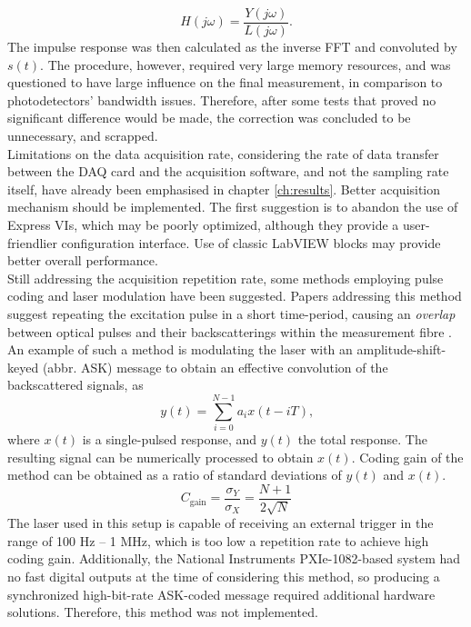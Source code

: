 \documentclass{standalone}
\begin{document}
\begin{equation}
H(j\omega) = \frac{Y(j\omega)}{L(j\omega)} \textrm{.}
\end{equation}
The impulse response was then calculated as the inverse FFT and convoluted by $s(t)$. The procedure, however, required very large memory resources, and was questioned to have large influence on the final measurement, in comparison to photodetectors' bandwidth issues. Therefore, after some tests that proved no significant difference would be made, the correction was concluded to be unnecessary, and scrapped. \\

Limitations on the data acquisition rate, considering the rate of data transfer between the DAQ card and the acquisition software, and not the sampling rate itself, have already been emphasised in chapter \ref{ch:results}. Better acquisition mechanism should be implemented. The first suggestion is to abandon the use of Express VIs, which may be poorly optimized, although they provide a user-friendlier configuration interface. Use of classic LabVIEW blocks may provide better overall performance. \\

Still addressing the acquisition repetition rate, some methods employing pulse coding and laser modulation have been suggested. Papers addressing this method suggest repeating the excitation pulse in a short time-period, causing an \textit{overlap} between optical pulses and their backscatterings within the measurement fibre \cite{coding1}\cite{coding2}. An example of such a method is modulating the laser with an amplitude-shift-keyed (abbr. ASK) message to obtain an effective convolution of the backscattered signals, as
\begin{equation}
y(t) = \sum_{i = 0}^{N-1} a_i x(t - iT) \textrm{,}
\end{equation}
where $x(t)$ is a single-pulsed response, and $y(t)$ the total response. The resulting signal can be numerically processed to obtain $x(t)$. Coding gain of the method can be obtained as a ratio of standard deviations of $y(t)$ and $x(t)$.
\begin{equation}
C_\textrm{gain} = \frac{\sigma_Y}{\sigma_X} = \frac{N+1}{2 \sqrt{N}}
\end{equation}
The laser used in this setup is capable of receiving an external trigger in the range of 100 Hz -- 1 MHz, which is too low a repetition rate to achieve high coding gain. Additionally, the National Instruments PXIe-1082-based system had no fast digital outputs at the time of considering this method, so producing a synchronized high-bit-rate ASK-coded message required additional hardware solutions. Therefore, this method was not implemented. \\
\end{document}
